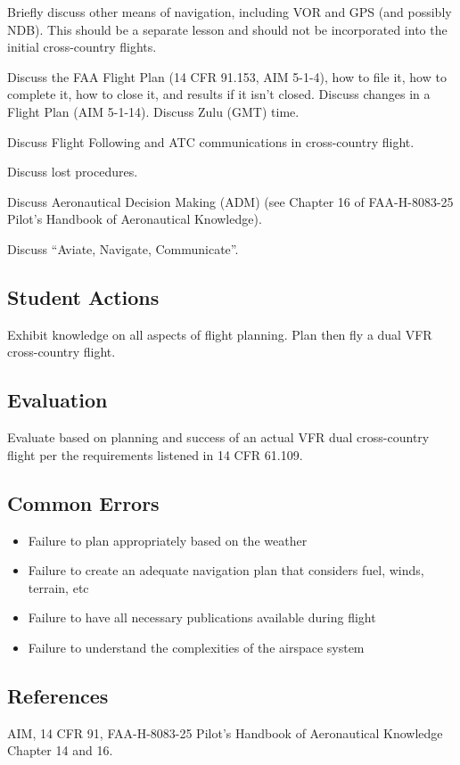 Briefly discuss other means of navigation, including VOR and GPS (and possibly
NDB). This should be a separate lesson and should not be incorporated into the
initial cross-country flights.

Discuss the FAA Flight Plan (14 CFR 91.153, AIM 5-1-4), how to file it, how to
complete it, how to close it, and results if it isn't closed. Discuss changes
in a Flight Plan (AIM 5-1-14). Discuss Zulu (GMT) time.

Discuss Flight Following and ATC communications in cross-country flight.

Discuss lost procedures.

Discuss Aeronautical Decision Making (ADM) (see Chapter 16 of FAA-H-8083-25
Pilot's Handbook of Aeronautical Knowledge).

Discuss ``Aviate, Navigate, Communicate''.

\subsection{Student Actions}

Exhibit knowledge on all aspects of flight planning. Plan then fly a dual VFR
cross-country flight.

\subsection{Evaluation}

Evaluate based on planning and success of an actual VFR dual cross-country
flight per the requirements listened in 14 CFR 61.109.

\subsection{Common Errors}

\begin{itemize}
  \item Failure to plan appropriately based on the weather
  \item Failure to create an adequate navigation plan that considers fuel,
    winds, terrain, etc
  \item Failure to have all necessary publications available during flight
  \item Failure to understand the complexities of the airspace system
\end{itemize}

\subsection{References}

AIM, 14 CFR 91, FAA-H-8083-25 Pilot's Handbook of Aeronautical Knowledge
Chapter 14 and 16.

